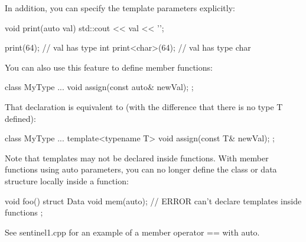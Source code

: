 In addition, you can specify the template parameters explicitly:

\begin{cpp}
void print(auto val)
{
	std::cout << val << '\n';
}

print(64); // val has type int
print<char>(64); // val has type char
\end{cpp}



You can also use this feature to define member functions:

\begin{cpp}
class MyType {
	...
	void assign(const auto& newVal);
};
\end{cpp}

That declaration is equivalent to (with the difference that there is no type T defined):

\begin{cpp}
class MyType {
	...
	template<typename T>
	void assign(const T& newVal);
};
\end{cpp}

Note that templates may not be declared inside functions. With member functions using auto parameters, you can no longer define the class or data structure locally inside a function:

\begin{cpp}
void foo()
{
	struct Data {
		void mem(auto); // ERROR can’t declare templates inside functions
	};
}
\end{cpp}

See sentinel1.cpp for an example of a member operator == with auto.
